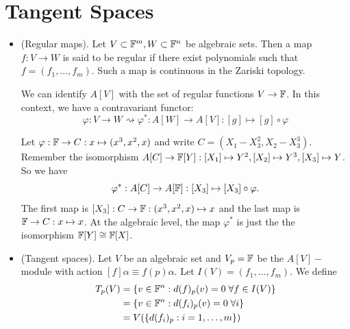 \section{Tangent Spaces}
\begin{itemize}
    \item(Regular maps).
    Let $V\subset\mathbb{F}^m, W\subset\mathbb{F}^n$ be algebraic sets. 
    Then a map $f:V\to W$ is said to be regular if there exist polynomials such that 
    $f=(f_1,\dots,f_m)$. Such a map is continuous in the Zariski topology. 
    \begin{remark}
        We can identify $A[V]$ with the set of regular functions $V\to\mathbb{F}$. In this 
        context, we have a contravariant functor:
        \begin{equation}
            \varphi: V\to W \rightsquigarrow \varphi^*:A[W]\to A[V]: [g]\mapsto [g]\circ\varphi
        \end{equation}
    \end{remark}
  \begin{example}
    Let $\varphi:\mathbb{F}\to C:x\mapsto (x^3,x^2,x)$ and write $C=(X_1-X_3^2,X_2-X_3^3)$. Remember the isomorphism
    $A[C]\to \mathbb{F}[Y]: [X_1]\mapsto Y^2,[X_2]\mapsto Y^3,[X_3]\mapsto Y$. So we have 
    \begin{equation}
        \varphi^*:A[C]\to A[\mathbb{F}]:[X_3]\mapsto [X_3]\circ\varphi. 
    \end{equation}
    The first map is $[X_3]:C\to \mathbb{F}:(x^3,x^2,x)\mapsto x$ and the last map is $\mathbb{F}\to C:x\mapsto x$. 
    At the algebraic level, the map $\varphi^*$ is just the the isomorphism $\mathbb{F}[Y]\cong\mathbb{F}[X]$.
  \end{example}
  \item(Tangent spaces). Let $V$ be an algebraic set and 
  $V_p = \mathbb{F}$ be the $A[V]-$module with action $[f]\alpha\equiv f(p)\alpha$. Let 
  $I(V) = (f_1,\dots, f_m)$. We define 
  \begin{equation}
    \begin{split}
        T_p(V) &= \{v\in\mathbb{F}^n: d(f)_p(v)=0\;\forall f\in I(V)\}\\
           &=\{v\in\mathbb{F}^n: d(f_i)_p(v)=0\;\forall i\}\\
           &=V(\{d(f_i)_p:i=1,\dots,m\})
    \end{split}
  \end{equation}


\end{itemize}
